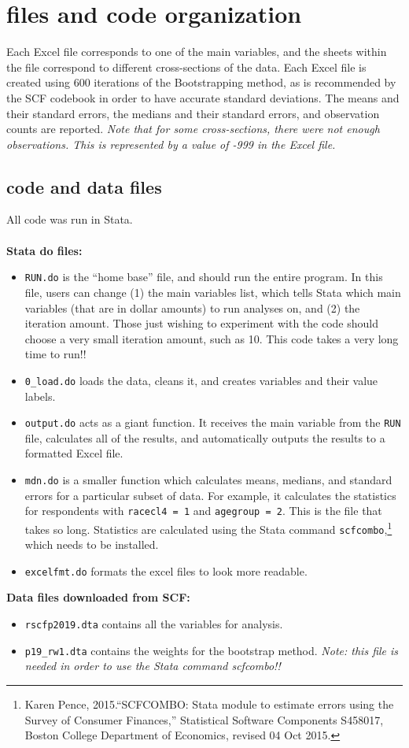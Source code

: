 \documentclass[12pt]{article}
\begin{document}
\section{files and code organization}
Each Excel file corresponds to one of the main variables, and the sheets within the file correspond to different cross-sections of the data. Each Excel file is created using 600 iterations of the Bootstrapping method, as is recommended by the SCF codebook in order to have accurate standard deviations. The means and their standard errors, the medians and their standard errors, and observation counts are reported. \textit{Note that for some cross-sections, there were not enough observations. This is represented by a value of -999 in the Excel file.}

\subsection{code and data files}
All code was run in Stata. 
\\\\
\textbf{Stata do files:}
\begin{itemize}
	\item \texttt{RUN.do} is the ``home base'' file, and should run the entire program. In this file, users can change (1) the main variables list, which tells Stata which main variables (that are in dollar amounts) to run analyses on, and (2) the iteration amount. Those just wishing to experiment with the code should choose a very small iteration amount, such as 10. This code takes a very long time to run!! 
	\item \texttt{0\_load.do} loads the data, cleans it, and creates variables and their value labels. 
	\item \texttt{output.do} acts as a giant function. It receives the main variable from the \texttt{RUN} file, calculates all of the results, and automatically outputs the results to a formatted Excel file. 
	\item \texttt{mdn.do} is a smaller function which calculates means, medians, and standard errors for a particular subset of data. For example, it calculates the statistics for respondents with \texttt{racecl4 = 1} and \texttt{agegroup = 2}. This is the file that takes so long. Statistics are calculated using the Stata command \texttt{scfcombo},\footnote{Karen Pence, 2015.``SCFCOMBO: Stata module to estimate errors using the Survey of Consumer Finances,'' Statistical Software Components S458017, Boston College Department of Economics, revised 04 Oct 2015.} which needs to be installed. 
	\item \texttt{excelfmt.do} formats the excel files to look more readable. 
\end{itemize}
\textbf{Data files downloaded from SCF:}
\begin{itemize}
	\item \texttt{rscfp2019.dta} contains all the variables for analysis. 
	\item \texttt{p19\_rw1.dta} contains the weights for the bootstrap method. \textit{Note: this file is needed in order to use the Stata command scfcombo!!} 
\end{itemize}
\end{document}
